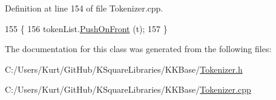 Definition at line 154 of file Tokenizer.\+cpp.


\begin{DoxyCode}
155 \{
156   tokenList.\hyperlink{class_k_k_b_1_1_k_k_queue_a07b83a99241a167f7a395a40d32f6380}{PushOnFront} (t);
157 \}
\end{DoxyCode}


The documentation for this class was generated from the following files\+:\begin{DoxyCompactItemize}
\item 
C\+:/\+Users/\+Kurt/\+Git\+Hub/\+K\+Square\+Libraries/\+K\+K\+Base/\hyperlink{_tokenizer_8h}{Tokenizer.\+h}\item 
C\+:/\+Users/\+Kurt/\+Git\+Hub/\+K\+Square\+Libraries/\+K\+K\+Base/\hyperlink{_tokenizer_8cpp}{Tokenizer.\+cpp}\end{DoxyCompactItemize}
